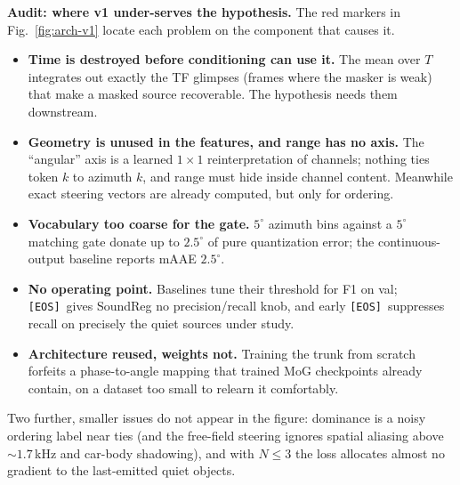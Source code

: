 \documentclass[10pt]{article}
\newcommand{\eos}{\texttt{[EOS]}}
\DeclareRobustCommand{\flagmk}[1]{\tikz[baseline=-0.62ex]{\node[circle,draw=red!70!black,
  fill=red!12,text=red!70!black,inner sep=0.8pt,font=\tiny\bfseries]{#1};}}
\begin{document}
\textbf{Audit: where v1 under-serves the hypothesis.} The red markers in
Fig.~\ref{fig:arch-v1} locate each problem on the component that causes it.
\begin{itemize}
\item \flagmk{1} \textbf{Time is destroyed before conditioning can use it.} The
mean over $T$ integrates out exactly the TF glimpses (frames where the masker is
weak) that make a masked source recoverable. The hypothesis needs them downstream.
\item \flagmk{2} \textbf{Geometry is unused in the features, and range has no
axis.} The ``angular'' axis is a learned $1{\times}1$ reinterpretation of channels;
nothing ties token $k$ to azimuth $k$, and range must hide inside channel content.
Meanwhile exact steering vectors are already computed, but only for ordering.
\item \flagmk{3} \textbf{Vocabulary too coarse for the gate.} $5^\circ$ azimuth bins
against a $5^\circ$ matching gate donate up to $2.5^\circ$ of pure quantization
error; the continuous-output baseline reports mAAE $2.5^\circ$.
\item \flagmk{4} \textbf{No operating point.} Baselines tune their threshold for F1
on val; \eos\ gives SoundReg no precision/recall knob, and early \eos\ suppresses
recall on precisely the quiet sources under study.
\item \flagmk{5} \textbf{Architecture reused, weights not.} Training the trunk from
scratch forfeits a phase-to-angle mapping that trained MoG checkpoints already
contain, on a dataset too small to relearn it comfortably.
\end{itemize}
Two further, smaller issues do not appear in the figure: dominance is a noisy
ordering label near ties (and the free-field steering ignores spatial aliasing
above ${\sim}1.7$\,kHz and car-body shadowing), and with $N\!\le\!3$ the loss
allocates almost no gradient to the last-emitted quiet objects.
\end{document}
